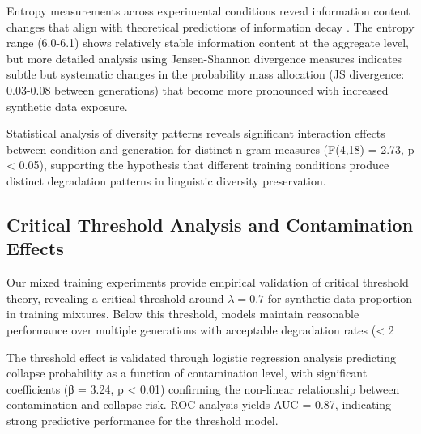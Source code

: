 \documentclass{article}
\begin{document}
Entropy measurements across experimental conditions reveal information content changes that align with theoretical predictions of information decay \cite{cover1999elements}. The entropy range (6.0-6.1) shows relatively stable information content at the aggregate level, but more detailed analysis using Jensen-Shannon divergence measures indicates subtle but systematic changes in the probability mass allocation (JS divergence: 0.03-0.08 between generations) that become more pronounced with increased synthetic data exposure.

Statistical analysis of diversity patterns reveals significant interaction effects between condition and generation for distinct n-gram measures (F(4,18) = 2.73, p < 0.05), supporting the hypothesis that different training conditions produce distinct degradation patterns in linguistic diversity preservation.

\subsection{Critical Threshold Analysis and Contamination Effects}

Our mixed training experiments provide empirical validation of critical threshold theory, revealing a critical threshold around $\lambda = 0.7$ for synthetic data proportion in training mixtures. Below this threshold, models maintain reasonable performance over multiple generations with acceptable degradation rates (< 2%

The threshold effect is validated through logistic regression analysis predicting collapse probability as a function of contamination level, with significant coefficients (β = 3.24, p < 0.01) confirming the non-linear relationship between contamination and collapse risk. ROC analysis yields AUC = 0.87, indicating strong predictive performance for the threshold model.
\end{document}
